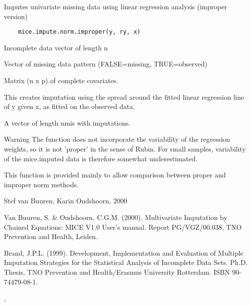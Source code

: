 \begin{Description}\relax
Imputes univariate missing data using linear regression analysis (improper version)
\end{Description}
\begin{Usage}
\begin{verbatim}
    mice.impute.norm.improper(y, ry, x)
\end{verbatim}
\end{Usage}
\begin{Arguments}
\begin{ldescription}
\item[\code{y}] Incomplete data vector of length n
\item[\code{ry}] Vector of missing data pattern (FALSE=missing, TRUE=observed)
\item[\code{x}] Matrix (n x p) of complete covariates.
\end{ldescription}
\end{Arguments}
\begin{Details}\relax
This creates imputation using the spread around the fitted 
linear regression line of y given x, as fitted on the observed data.
\end{Details}
\begin{Value}
A vector of length nmis with imputations.
\end{Value}
\begin{Section}{Warning}
The function does not incorporate the variability of the regression
weights, so it is not 'proper' in the sense of Rubin. For small samples, 
variability of the mice.imputed data is therefore somewhat underestimated.
\end{Section}
\begin{Note}\relax
This function is provided mainly to allow comparison between proper
and improper norm methods.
\end{Note}
\begin{Author}\relax
Stef van Buuren, Karin Oudshoorn, 2000
\end{Author}
\begin{References}\relax
Van Buuren, S. \& Oudshoorn, C.G.M. (2000). Multivariate Imputation by Chained Equations: 
MICE V1.0 User's manual. Report PG/VGZ/00.038, TNO Prevention and Health, Leiden.

Brand, J.P.L. (1999). Development, Implementation and Evaluation of
Multiple Imputation Strategies for the Statistical Analysis of
Incomplete Data Sets. Ph.D. Thesis, TNO Prevention
and Health/Erasmus University Rotterdam. ISBN 90-74479-08-1.
\end{References}
\begin{SeeAlso}\relax
{},  
\end{SeeAlso}

